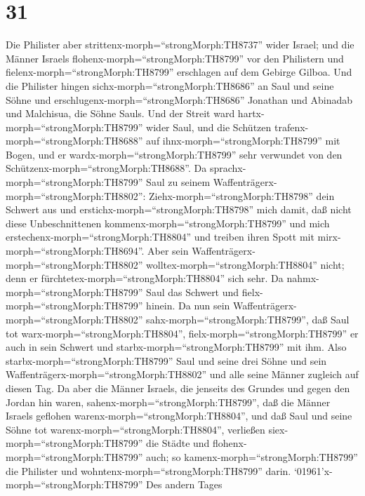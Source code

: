 \hypertarget{section-30}{%
\section{31}\label{section-30}}

 Die Philister aber strittenx-morph=``strongMorph:TH8737''
wider Israel; und die Männer Israels
flohenx-morph=``strongMorph:TH8799'' vor den Philistern und
fielenx-morph=``strongMorph:TH8799'' erschlagen auf dem Gebirge Gilboa.
 Und die Philister hingen sichx-morph=``strongMorph:TH8686''
an Saul und seine Söhne und erschlugenx-morph=``strongMorph:TH8686''
Jonathan und Abinadab und Malchisua, die Söhne Sauls.  Und
der Streit ward hartx-morph=``strongMorph:TH8799'' wider Saul, und die
Schützen trafenx-morph=``strongMorph:TH8688'' auf
ihnx-morph=``strongMorph:TH8799'' mit Bogen, und er
wardx-morph=``strongMorph:TH8799'' sehr verwundet von den
Schützenx-morph=``strongMorph:TH8688''.  Da
sprachx-morph=``strongMorph:TH8799'' Saul zu seinem
Waffenträgerx-morph=``strongMorph:TH8802'':
Ziehx-morph=``strongMorph:TH8798'' dein Schwert aus und
erstichx-morph=``strongMorph:TH8798'' mich damit, daß nicht diese
Unbeschnittenen kommenx-morph=``strongMorph:TH8799'' und mich
erstechenx-morph=``strongMorph:TH8804'' und treiben ihren Spott mit
mirx-morph=``strongMorph:TH8694''. Aber sein
Waffenträgerx-morph=``strongMorph:TH8802''
wolltex-morph=``strongMorph:TH8804'' nicht; denn er
fürchtetex-morph=``strongMorph:TH8804'' sich sehr. Da
nahmx-morph=``strongMorph:TH8799'' Saul das Schwert und
fielx-morph=``strongMorph:TH8799'' hinein.  Da nun sein
Waffenträgerx-morph=``strongMorph:TH8802''
sahx-morph=``strongMorph:TH8799'', daß Saul tot
warx-morph=``strongMorph:TH8804'', fielx-morph=``strongMorph:TH8799'' er
auch in sein Schwert und starbx-morph=``strongMorph:TH8799'' mit ihm.
 Also starbx-morph=``strongMorph:TH8799'' Saul und seine
drei Söhne und sein Waffenträgerx-morph=``strongMorph:TH8802'' und alle
seine Männer zugleich auf diesen Tag.  Da aber die Männer
Israels, die jenseits des Grundes und gegen den Jordan hin waren,
sahenx-morph=``strongMorph:TH8799'', daß die Männer Israels geflohen
warenx-morph=``strongMorph:TH8804'', und daß Saul und seine Söhne tot
warenx-morph=``strongMorph:TH8804'', verließen
siex-morph=``strongMorph:TH8799'' die Städte und
flohenx-morph=``strongMorph:TH8799'' auch; so
kamenx-morph=``strongMorph:TH8799'' die Philister und
wohntenx-morph=``strongMorph:TH8799'' darin. 
`01961'\textbar x-morph=``strongMorph:TH8799'' Des andern Tages
